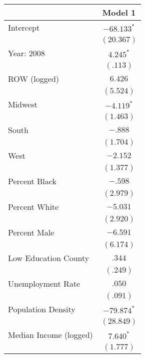 
\begin{tabular}{l c}
\hline
 & Model 1 \\
\hline
Intercept                             & $-68.133^{*}$ \\
                                      & $(20.367)$    \\
Year: 2008                            & $4.245^{*}$   \\
                                      & $(.113)$      \\
ROW (logged)                          & $6.426$       \\
                                      & $(5.524)$     \\
Midwest                               & $-4.119^{*}$  \\
                                      & $(1.463)$     \\
South                                 & $-.888$       \\
                                      & $(1.704)$     \\
West                                  & $-2.152$      \\
                                      & $(1.377)$     \\
Percent Black                         & $-.598$       \\
                                      & $(2.979)$     \\
Percent White                         & $-5.031$      \\
                                      & $(2.920)$     \\
Percent Male                          & $-6.591$      \\
                                      & $(6.174)$     \\
Low Education County                  & $.344$        \\
                                      & $(.249)$      \\
Unemployment Rate                     & $.050$        \\
                                      & $(.091)$      \\
Population Density                    & $-79.874^{*}$ \\
                                      & $(28.849)$    \\
Median Income (logged)                & $7.640^{*}$   \\
                                      & $(1.777)$     \\

\end{tabular}
